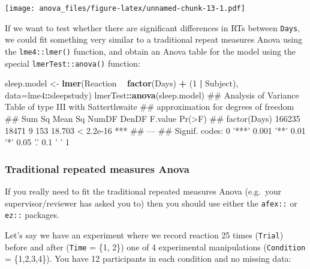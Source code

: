 \documentclass[]{article}
\newenvironment{Shaded}{\begin{snugshade}}{\end{snugshade}}
\newcommand{\KeywordTok}[1]{\textcolor[rgb]{0.13,0.29,0.53}{\textbf{#1}}}
\newcommand{\DataTypeTok}[1]{\textcolor[rgb]{0.13,0.29,0.53}{#1}}
\newcommand{\DecValTok}[1]{\textcolor[rgb]{0.00,0.00,0.81}{#1}}
\newcommand{\StringTok}[1]{\textcolor[rgb]{0.31,0.60,0.02}{#1}}
\newcommand{\OperatorTok}[1]{\textcolor[rgb]{0.81,0.36,0.00}{\textbf{#1}}}
\newcommand{\NormalTok}[1]{#1}
\theoremstyle{definition}
\theoremstyle{definition}
\theoremstyle{definition}
\theoremstyle{remark}
\begin{document}
\texttt{[image: anova\_files/figure-latex/unnamed-chunk-13-1.pdf]}

If we want to test whether there are significant differences in RTs
between \texttt{Days}, we could fit something very similar to a
traditional repeat measures Anova using the \texttt{lme4::lmer()}
function, and obtain an Anova table for the model using the special
\texttt{lmerTest::anova()} function:

\begin{Shaded}
\begin{Highlighting}[]
\NormalTok{sleep.model <-}\StringTok{ }\KeywordTok{lmer}\NormalTok{(Reaction }\OperatorTok{~}\StringTok{ }\KeywordTok{factor}\NormalTok{(Days) }\OperatorTok{+}\StringTok{ }\NormalTok{(}\DecValTok{1} \OperatorTok{|}\StringTok{ }\NormalTok{Subject), }\DataTypeTok{data=}\NormalTok{lme4}\OperatorTok{::}\NormalTok{sleepstudy)}
\NormalTok{lmerTest}\OperatorTok{::}\KeywordTok{anova}\NormalTok{(sleep.model)}
\NormalTok{## Analysis of Variance Table of type III  with  Satterthwaite }
\NormalTok{## approximation for degrees of freedom}
\NormalTok{##              Sum Sq Mean Sq NumDF DenDF F.value    Pr(>F)    }
\NormalTok{## factor(Days) 166235   18471     9   153  18.703 < 2.2e-16 ***}
\NormalTok{## ---}
\NormalTok{## Signif. codes:  0 '***' 0.001 '**' 0.01 '*' 0.05 '.' 0.1 ' ' 1}
\end{Highlighting}
\end{Shaded}

\hypertarget{trad-rm-anova}{\subsubsection*{Traditional repeated
measures Anova}\label{trad-rm-anova}}

If you really need to fit the traditional repeated measures Anova
(e.g.~your supervisor/reviewer has asked you to) then you should use
either the \texttt{afex::} or \texttt{ez::} packages.

Let's say we have an experiment where we record reaction 25 times
(\texttt{Trial}) before and after (\texttt{Time} = \{1, 2\}) one of 4
experimental manipulations (\texttt{Condition} = \{1,2,3,4\}). You have
12 participants in each condition and no missing data:

\begin{Shaded}
\end{Shaded}
\end{document}
